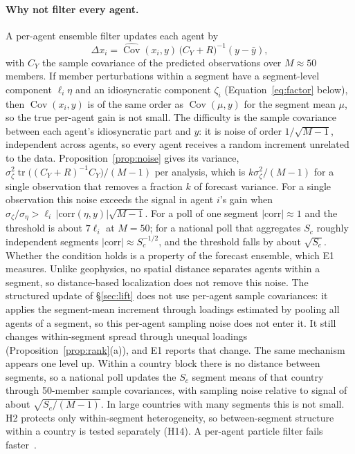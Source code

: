 \documentclass[10pt]{article}
\theoremstyle{remark}
\newcommand{\Cov}{\operatorname{Cov}}
\newcommand{\tr}{\operatorname{tr}}
\begin{document}
\paragraph{Why not filter every agent.} A per-agent ensemble filter updates each agent by \[\Delta x_i = \widehat{\Cov}(x_i, y)\,\big(C_Y+R\big)^{-1}(y-\bar y),\] with $C_Y$ the sample covariance of the predicted observations over $M\approx50$ members. If member perturbations within a segment have a segment-level component $\ell_i\eta$ and an idiosyncratic component $\zeta_i$ (Equation~\eqref{eq:factor} below), then $\Cov(x_i,y)$ is of the same order as $\Cov(\mu,y)$ for the segment mean $\mu$, so the true per-agent gain is not small. The difficulty is the sample covariance between each agent's idiosyncratic part and $y$: it is noise of order $1/\sqrt{M-1}$, independent across agents, so every agent receives a random increment unrelated to the data. Proposition~\ref{prop:noise} gives its variance, $\sigma_\zeta^2\tr\big((C_Y+R)^{-1}C_Y\big)/(M-1)$ per analysis, which is $k\sigma_\zeta^2/(M-1)$ for a single observation that removes a fraction $k$ of forecast variance. For a single observation this noise exceeds the signal in agent $i$'s gain when $\sigma_\zeta/\sigma_\eta>\ell_i\,|\mathrm{corr}(\eta,y)|\sqrt{M-1}$. For a poll of one segment $|\mathrm{corr}|\approx1$ and the threshold is about $7\ell_i$ at $M=50$; for a national poll that aggregates $S_c$ roughly independent segments $|\mathrm{corr}|\approx S_c^{-1/2}$, and the threshold falls by about $\sqrt{S_c}$. Whether the condition holds is a property of the forecast ensemble, which E1 measures. Unlike geophysics, no spatial distance separates agents within a segment, so distance-based localization does not remove this noise. The structured update of \S\ref{sec:lift} does not use per-agent sample covariances: it applies the segment-mean increment through loadings estimated by pooling all agents of a segment, so this per-agent sampling noise does not enter it. It still changes within-segment spread through unequal loadings (Proposition~\ref{prop:rank}(a)), and E1 reports that change. The same mechanism appears one level up. Within a country block there is no distance between segments, so a national poll updates the $S_c$ segment means of that country through 50-member sample covariances, with sampling noise relative to signal of about $\sqrt{S_c/(M-1)}$. In large countries with many segments this is not small. H2 protects only within-segment heterogeneity, so between-segment structure within a country is tested separately (H14). A per-agent particle filter fails faster~\cite{snyder2008,malleson2020}.
\end{document}
